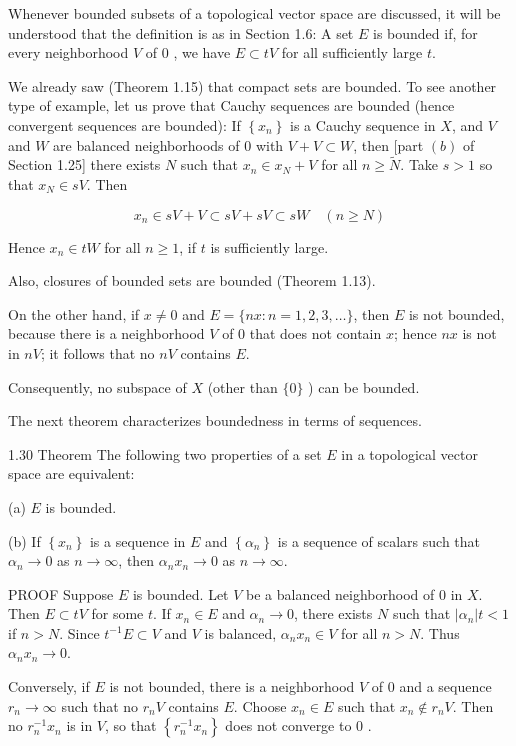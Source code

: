 \documentclass[10pt]{article}
\begin{document}
Whenever bounded subsets of a topological vector space are discussed, it will be understood that the definition is as in Section 1.6: A set $E$ is bounded if, for every neighborhood $V$ of 0 , we have $E \subset t V$ for all sufficiently large $t$.

We already saw (Theorem 1.15) that compact sets are bounded. To see another type of example, let us prove that Cauchy sequences are bounded (hence convergent sequences are bounded): If $\left\{x_{n}\right\}$ is a Cauchy sequence in $X$, and $V$ and $W$ are balanced neighborhoods of 0 with $V+V \subset W$, then [part $(b)$ of Section 1.25] there exists $N$ such that $x_{n} \in x_{N}+V$ for all $n \geq \tilde{N}$. Take $s>1$ so that $x_{N} \in s V$. Then

$$
x_{n} \in s V+V \subset s V+s V \subset s W \quad(n \geq N)
$$

Hence $x_{n} \in t W$ for all $n \geq 1$, if $t$ is sufficiently large.

Also, closures of bounded sets are bounded (Theorem 1.13).

On the other hand, if $x \neq 0$ and $E=\{n x: n=1,2,3, \ldots\}$, then $E$ is not bounded, because there is a neighborhood $V$ of 0 that does not contain $x$; hence $n x$ is not in $n V$; it follows that no $n V$ contains $E$.

Consequently, no subspace of $X$ (other than $\{0\}$ ) can be bounded.

The next theorem characterizes boundedness in terms of sequences.

1.30 Theorem The following two properties of a set $E$ in a topological vector space are equivalent:

(a) $E$ is bounded.

(b) If $\left\{x_{n}\right\}$ is a sequence in $E$ and $\left\{\alpha_{n}\right\}$ is a sequence of scalars such that $\alpha_{n} \rightarrow 0$ as $n \rightarrow \infty$, then $\alpha_{n} x_{n} \rightarrow 0$ as $n \rightarrow \infty$.

PROOF Suppose $E$ is bounded. Let $V$ be a balanced neighborhood of 0 in $X$. Then $E \subset t V$ for some $t$. If $x_{n} \in E$ and $\alpha_{n} \rightarrow 0$, there exists $N$ such that $\left|\alpha_{n}\right| t<1$ if $n>N$. Since $t^{-1} E \subset V$ and $V$ is balanced, $\alpha_{n} x_{n} \in V$ for all $n>N$. Thus $\alpha_{n} x_{n} \rightarrow 0$.

Conversely, if $E$ is not bounded, there is a neighborhood $V$ of 0 and a sequence $r_{n} \rightarrow \infty$ such that no $r_{n} V$ contains $E$. Choose $x_{n} \in E$ such that $x_{n} \notin r_{n} V$. Then no $r_{n}^{-1} x_{n}$ is in $V$, so that $\left\{r_{n}^{-1} x_{n}\right\}$ does not converge to 0 .
\end{document}
